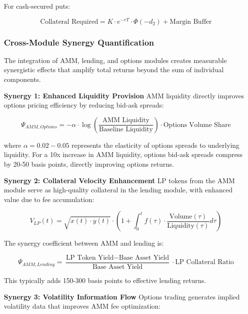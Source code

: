 \documentclass[12pt]{article}
\begin{document}
For cash-secured puts:

\begin{equation}
\text{Collateral Required} = K \cdot e^{-rT} \cdot \Phi(-d_2) + \text{Margin Buffer}
\end{equation}

\subsubsection{Cross-Module Synergy Quantification}

The integration of AMM, lending, and options modules creates measurable synergistic effects that amplify total returns beyond the sum of individual components.

\textbf{Synergy 1: Enhanced Liquidity Provision}
AMM liquidity directly improves options pricing efficiency by reducing bid-ask spreads:

\begin{equation}
\Psi_{AMM,Options} = -\alpha \cdot \log\left(\frac{\text{AMM Liquidity}}{\text{Baseline Liquidity}}\right) \cdot \text{Options Volume Share}
\end{equation}

where $\alpha = 0.02-0.05$ represents the elasticity of options spreads to underlying liquidity. For a 10x increase in AMM liquidity, options bid-ask spreads compress by 20-50 basis points, directly improving options returns.

\textbf{Synergy 2: Collateral Velocity Enhancement}
LP tokens from the AMM module serve as high-quality collateral in the lending module, with enhanced value due to fee accumulation:

\begin{equation}
V_{LP}(t) = \sqrt{x(t) \cdot y(t)} \cdot \left(1 + \int_0^t f(\tau) \cdot \frac{\text{Volume}(\tau)}{\text{Liquidity}(\tau)} d\tau\right)
\end{equation}

The synergy coefficient between AMM and lending is:

\begin{equation}
\Psi_{AMM,Lending} = \frac{\text{LP Token Yield} - \text{Base Asset Yield}}{\text{Base Asset Yield}} \cdot \text{LP Collateral Ratio}
\end{equation}

This typically adds 150-300 basis points to effective lending returns.

\textbf{Synergy 3: Volatility Information Flow}
Options trading generates implied volatility data that improves AMM fee optimization:
\end{document}
